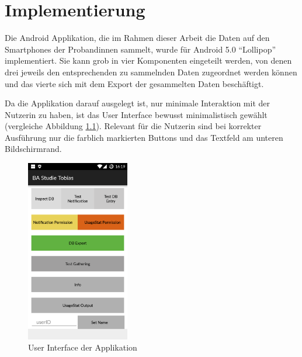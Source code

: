 
\chapter{Implementierung}
\label{ch:Implementierung}
Die Android Applikation, die im Rahmen dieser Arbeit die Daten auf den Smartphones der Probandinnen sammelt, wurde für Android 5.0 "`Lollipop"' implementiert.
Sie kann grob in vier Komponenten eingeteilt werden, von denen drei jeweils den entsprechenden zu sammelnden Daten zugeordnet werden können und das vierte sich mit dem Export der gesammelten Daten beschäftigt.

Da die Applikation darauf ausgelegt ist, nur minimale Interaktion mit der Nutzerin zu haben,
ist das User Interface bewusst minimalistisch gewählt (vergleiche Abbildung \ref{fig:uiscreen}).
Relevant für die Nutzerin sind bei korrekter Ausführung nur die farblich markierten Buttons und das Textfeld am unteren Bildschirmrand.

\begin{figure}[h]
    \centering
    \includegraphics[width=0.4\textwidth]{images/screenshot1.png}
    \caption{User Interface der Applikation}
    \label{fig:uiscreen}
\end{figure}



